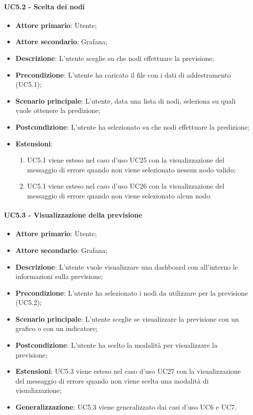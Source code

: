 \paragraph{UC5.2 - Scelta dei nodi}
\label{para:uc5.2}
\begin{itemize}
  \item \textbf{Attore primario}: Utente;
  \item \textbf{Attore secondario}: Grafana;
  \item \textbf{Descrizione}: L'utente sceglie su che nodi effettuare la previsione;
  \item \textbf{Precondizione}: L'utente ha caricato il file con i dati di addestramento (UC5.1);
  \item \textbf{Scenario principale}: L'utente, data una lista di nodi, seleziona su quali vuole ottenere la predizione;
  \item \textbf{Postcondizione}: L'utente ha selezionato su che nodi effettuare la predizione;
  \item \textbf{Estensioni}:
  \begin{enumerate}
    \item UC5.1 viene esteso nel caso d'uso UC25 con la visualizzazione del messaggio di errore quando non viene selezionato nessun nodo valido;
    \item UC5.1 viene esteso nel caso d'uso UC26 con la visualizzazione del messaggio di errore quando non viene selezionato alcun nodo.
    \end{enumerate}
\end{itemize}

\paragraph{UC5.3 - Visualizzazione della previsione}%
\label{para:uc5.3}
\begin{itemize}
  \item \textbf{Attore primario}: Utente;
  \item \textbf{Attore secondario}: Grafana;
  \item \textbf{Descrizione}: L'utente vuole visualizzare una dashboard con all'interno le informazioni sulla previsione;
  \item \textbf{Precondizione}: L'utente ha selezionato i nodi da utilizzare per la previsione (UC5.2);
  \item \textbf{Scenario principale}: L'utente sceglie se visualizzare la previsione con un grafico o con un indicatore;
  \item \textbf{Postcondizione}: L'utente ha scelto la modalità per visualizzare la previsione;
  \item \textbf{Estensioni}: UC5.3 viene esteso nel caso d'uso UC27 con la visualizzazione del messaggio di errore quando non viene scelta una modalità di visualizzazione;
  \item \textbf{Generalizzazione}: UC5.3 viene generalizzato dai casi d'uso UC6 e UC7.
\end{itemize}
